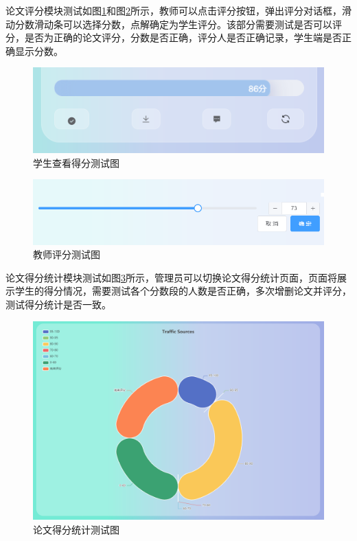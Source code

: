 论文评分模块测试如图\ref{score-student}和图\ref{score-teacher}所示，教师可以点击评分按钮，弹出评分对话框，滑动分数滑动条可以选择分数，点解确定为学生评分。该部分需要测试是否可以评分，是否为正确的论文评分，分数是否正确，评分人是否正确记录，学生端是否正确显示分数。

\begin{figure}[htbp]
  \centering
  \includegraphics[scale = 0.6]{out/figure/测试/score-student.png}
  \caption{\song\wuhao 学生查看得分测试图}
  \label{score-student}
\end{figure}

\begin{figure}[htbp]
  \centering
  \includegraphics[scale = 0.6]{out/figure/测试/score-teacher.png}
  \caption{\song\wuhao 教师评分测试图}
  \label{score-teacher}
\end{figure}

论文得分统计模块测试如图\ref{statistic-score-student-test}所示，管理员可以切换论文得分统计页面，页面将展示学生的得分情况，需要测试各个分数段的人数是否正确，多次增删论文并评分，测试得分统计是否一致。

\begin{figure}[htbp]
  \centering
  \includegraphics[scale = 0.48]{out/figure/测试/statistic-score-student-test.png}
  \caption{\song\wuhao 论文得分统计测试图}
  \label{statistic-score-student-test}
\end{figure}

